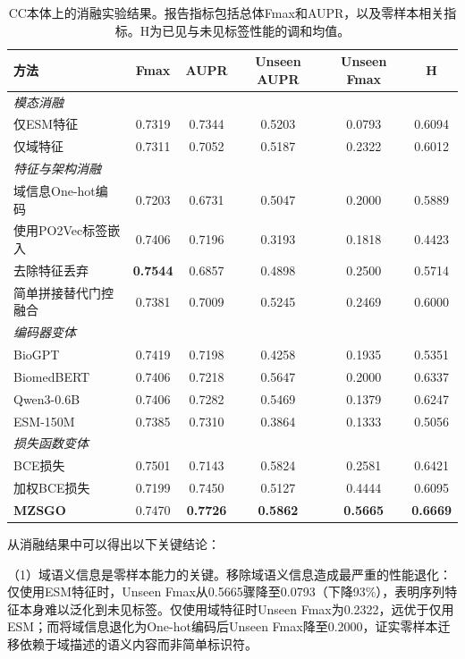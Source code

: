 \begin{table}[htbp]
  \centering
  \caption{CC本体上的消融实验结果。报告指标包括总体Fmax和AUPR，以及零样本相关指标。H为已见与未见标签性能的调和均值。}
  \label{tab:mzsgo_ablation}
  \small
    \begin{tabular}{lccccc}
    \toprule
    \textbf{方法} & \textbf{Fmax} & \textbf{AUPR} & \textbf{Unseen AUPR} & \textbf{Unseen Fmax} & \textbf{H} \\
    \midrule
    \multicolumn{6}{l}{\textit{模态消融}} \\
    仅ESM特征 & 0.7319 & 0.7344 & 0.5203 & 0.0793 & 0.6094 \\
    仅域特征 & 0.7311 & 0.7052 & 0.5187 & 0.2322 & 0.6012 \\
    \midrule
    \multicolumn{6}{l}{\textit{特征与架构消融}} \\
    域信息One-hot编码 & 0.7203 & 0.6731 & 0.5047 & 0.2000 & 0.5889 \\
    使用PO2Vec标签嵌入 & 0.7406 & 0.7196 & 0.3193 & 0.1818 & 0.4423 \\
    去除特征丢弃 & \textbf{0.7544} & 0.6857 & 0.4898 & 0.2500 & 0.5714 \\
    简单拼接替代门控融合 & 0.7381 & 0.7009 & 0.5245 & 0.2469 & 0.6000 \\
    \midrule
    \multicolumn{6}{l}{\textit{编码器变体}} \\
    BioGPT & 0.7419 & 0.7198 & 0.4258 & 0.1935 & 0.5351 \\
    BiomedBERT & 0.7406 & 0.7218 & 0.5647 & 0.2000 & 0.6337 \\
    Qwen3-0.6B & 0.7406 & 0.7282 & 0.5469 & 0.1379 & 0.6247 \\
    ESM-150M & 0.7385 & 0.7310 & 0.3864 & 0.1333 & 0.5056 \\
    \midrule
    \multicolumn{6}{l}{\textit{损失函数变体}} \\
    BCE损失 & 0.7501 & 0.7143 & 0.5824 & 0.2581 & 0.6421 \\
    加权BCE损失 & 0.7199 & 0.7450 & 0.5127 & 0.4444 & 0.6095 \\
    \midrule
    \textbf{MZSGO} & 0.7470 & \textbf{0.7726} & \textbf{0.5862} & \textbf{0.5665} & \textbf{0.6669} \\
    \bottomrule
    \end{tabular}
\end{table}

从消融结果中可以得出以下关键结论：

（1）域语义信息是零样本能力的关键。移除域语义信息造成最严重的性能退化：仅使用ESM特征时，Unseen Fmax从0.5665骤降至0.0793（下降93\%），表明序列特征本身难以泛化到未见标签。仅使用域特征时Unseen Fmax为0.2322，远优于仅用ESM；而将域信息退化为One-hot编码后Unseen Fmax降至0.2000，证实零样本迁移依赖于域描述的语义内容而非简单标识符。

